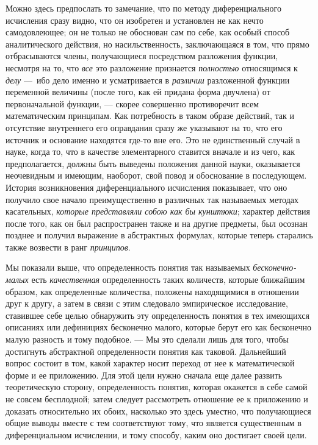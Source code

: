 {Можно здесь предпослать то замечание, что по методу диференциального
исчисления сразу видно, что он изобретен и установлен не как нечто
самодовлеющее; он не только не обоснован сам по себе, как особый способ
аналитического действия, но насильственность, заключающаяся в том, что
прямо отбрасываются члены, получающиеся посредством разложения функции,
несмотря на то, что {\em все} это разложение признается
{\em полностью} относящимся к
{\em делу} —~ибо дело именно и усматривается в
{\em различии} разложенной функции переменной величины
(после того, как ей придана форма двучлена) от первоначальной функции, —
скорее совершенно противоречит всем математическим принципам. Как
потребность в таком образе действий, так и отсутствие внутреннего его
оправдания сразу же указывают на то, что его источник и основание находятся
где-то вне его. Это не единственный случай в науке, когда то, что в
качестве элементарного ставится вначале и из чего, как предполагается,
должны быть выведены положения данной науки, оказывается неочевидным и
имеющим, наоборот, свой повод и обоснование в последующем. История
возникновения диференциального исчисления показывает, что оно получило свое
начало преимущественно в различных так называемых методах касательных,
{\em которые представляли собою как бы кунштюки};
характер действия после того, как он был распространен также и на другие
предметы, был осознан позднее и получил выражение в абстрактных формулах,
которые теперь старались также возвести в ранг
{\em принципов}.

Мы показали выше, что определенность понятия так называемых
{\em бесконечно-малых} есть
{\em качественная} определенность таких количеств,
которые ближайшим образом, как определенные количества, положены
находящимися в отношении друг к другу, а затем в связи с этим следовало
эмпирическое исследование, ставившее себе целью обнаружить эту
определенность понятия в тех имеющихся описаниях или дефинициях бесконечно
малого, которые берут его как бесконечно малую разность и тому подобное. —
Мы это сделали лишь для того, чтобы достигнуть абстрактной определенности
понятия как таковой. Дальнейший вопрос состоит в том, какой характер носит
переход от нее к математической форме и ее приложению. Для этой цели нужно
сначала еще далее развить теоретическую сторону, определенность понятия,
которая окажется в себе самой не совсем бесплодной; затем следует
рассмотреть отношение ее к приложению и доказать относительно их обоих,
насколько это здесь уместно, что получающиеся общие выводы вместе с тем
соответствуют тому, что является существенным в диференциальном исчислении,
и тому способу, каким оно достигает своей цели.

}

